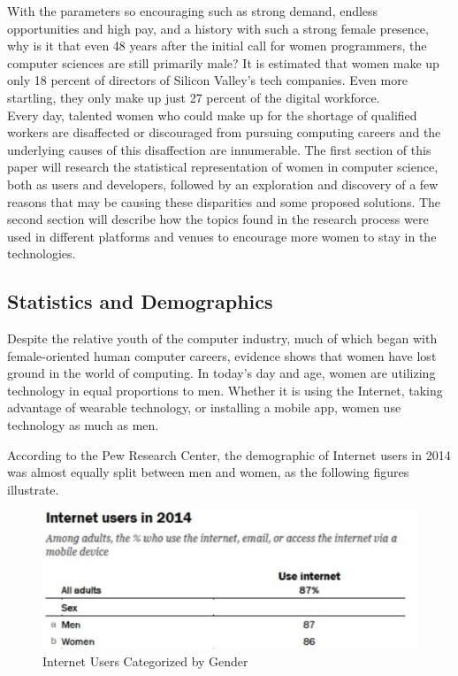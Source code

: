 \documentclass[12pt]{article}
\begin{document}
	With the parameters so encouraging such as strong demand, endless opportunities and high pay, and a history with such a strong female presence, why is it that even 48 years after the initial call for women programmers, the computer sciences are still primarily male? It is estimated that women make up only 18 percent of directors of Silicon Valley’s tech companies. Even more startling, they only make up just 27 percent of the digital workforce\cite{silicon}.\\
	
	Every day, talented women who could make up for the shortage of qualified workers are disaffected or discouraged from pursuing computing careers and the underlying causes of this disaffection are innumerable.	The first section of this paper will research the statistical representation of women in computer science, both as users and developers, followed by an exploration and discovery of a few reasons that may be causing these disparities and some proposed solutions. The second section will describe how the topics found in the research process were used in different platforms and venues to encourage more women to stay in the technologies.\\
	
	
	\pagebreak
	
	\subsection{Statistics and Demographics} %
	Despite the relative youth of the computer industry, much of which began with female-oriented human computer careers, evidence shows that women have lost ground in the world of computing. In today's day and age, women are utilizing technology in equal proportions to men. Whether it is using the Internet, taking advantage of wearable technology, or installing a mobile app, women use technology as much as men.  
	
	According to the Pew Research Center, the demographic of Internet users in 2014 was almost equally split between men and women, as the following figures illustrate. \\
	
	\begin{figure}[H]
		\begin{center}
			\includegraphics[]{StatsInternet.JPG}
			\caption{Internet Users Categorized by Gender}		
		\end{center}
	\end{figure}
	
\end{document}
